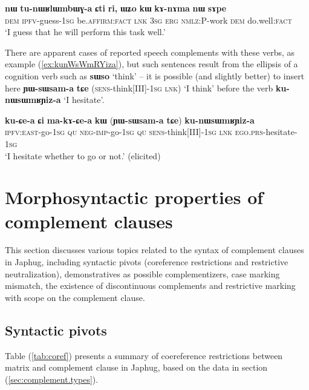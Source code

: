 \documentclass[oneside,a4paper,11pt]{article}
\newcommand{\ipa}[1]{\textbf{\phon#1}} %
\newcommand{\jpg}[2]{\ipa{#1} `#2'} %
\begin{document}
\begin{exe}
\ex \label{ex:tunWRlWmbWGa}
\gll \ipa{nɯ} 	\ipa{tu-nɯʁlɯmbɯɣ-a} 	\ipa{ɕti} 	\ipa{ri,} 	\ipa{ɯʑo} 	\ipa{kɯ} 	\ipa{kɤ-nɤma} 	\ipa{nɯ} 	\ipa{sɤpe} \\
\textsc{dem} \textsc{ipfv}-guess-\textsc{1sg} be.\textsc{affirm:fact} \textsc{lnk} \textsc{3sg} \textsc{erg} \textsc{nmlz:P}-work \textsc{dem} do.well:\textsc{fact} \\
\glt `I guess that he will perform this task well.'
\end{exe}

There are apparent cases of reported speech complements with these verbs, as example (\ref{ex:kunWsWmRYiza}), but such sentences result from the ellipsis of a cognition verb such as \jpg{sɯso}{think} -- it is possible (and slightly better) to insert here \ipa{ɲɯ-sɯsam-a} 	\ipa{tɕe} (\textsc{sens}-think[III]-\textsc{1sg} \textsc{lnk}) `I think' before the verb \ipa{ku-nɯsɯmʁɲiz-a}  `I hesitate'.

\begin{exe}
\ex \label{ex:kunWsWmRYiza}
\gll 
\ipa{ku-ɕe-a} 	\ipa{ɕi} 	\ipa{ma-kɤ-ɕe-a} 	\ipa{kɯ} (\ipa{ɲɯ-sɯsam-a} 	\ipa{tɕe}) \ipa{ku-nɯsɯmʁɲiz-a} \\
\textsc{ipfv:east}-go-\textsc{1sg} \textsc{qu} \textsc{neg-imp}-go-\textsc{1sg} \textsc{qu} \textsc{sens}-think[III]-\textsc{1sg} \textsc{lnk} \textsc{ego.prs}-hesitate-\textsc{1sg} \\
\glt `I hesitate whether to go or not.' (elicited)
\end{exe}

\section{Morphosyntactic properties of complement clauses} 
This section discusses various topics related to the syntax of complement clauses in Japhug, including syntactic pivots (coreference restrictions and restrictive neutralization), demonstratives as possible complementizers, case marking mismatch, the existence of discontinuous complements and restrictive marking with scope on the complement clause.

 \subsection{Syntactic pivots} 
Table (\ref{tab:coref}) presents a summary of coereference restrictions between matrix and complement clause in Japhug, based on the data in section (\ref{sec:complement.types}).
\end{document}
